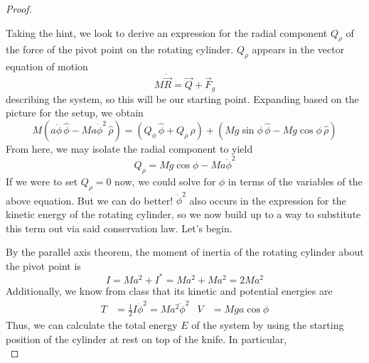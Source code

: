 \documentclass[../psets.tex]{subfiles}
\begin{document}
\begin{enumerate}
\begin{proof}
\begin{center}
        \end{center}
        Taking the hint, we look to derive an expression for the radial component $Q_\rho$ of the force of the pivot point on the rotating cylinder. $Q_\rho$ appears in the vector equation of motion
        \begin{equation*}
            M\ddot{\vec{R}} = \vec{Q}+\vec{F}_g
        \end{equation*}
        describing the system, so this will be our starting point. Expanding based on the picture for the setup, we obtain
        \begin{equation*}
            M(a\ddot{\phi}\,\hat{\phi}-Ma\dot{\phi}^2\,\hat{\rho}) = (Q_\phi\,\hat{\phi}+Q_\rho\,\hat{\rho})+(Mg\sin\phi\,\hat{\phi}-Mg\cos\phi\,\hat{\rho})
        \end{equation*}
        From here, we may isolate the radial component to yield
        \begin{equation*}
            Q_\rho = Mg\cos\phi-Ma\dot{\phi}^2
        \end{equation*}
        If we were to set $Q_\rho=0$ now, we could solve for $\phi$ in terms of the variables of the above equation. But we can do better! $\dot{\phi}^2$ also occurs in the expression for the kinetic energy of the rotating cylinder, so we now build up to a way to substitute this term out via said conservation law. Let's begin.\par
        By the parallel axis theorem, the moment of inertia of the rotating cylinder about the pivot point is
        \begin{equation*}
            I = Ma^2+I^*
            = Ma^2+Ma^2
            = 2Ma^2
        \end{equation*}
        Additionally, we know from class that its kinetic and potential energies are
        \begin{align*}
            T &= \frac{1}{2}I\dot{\phi}^2
                = Ma^2\dot{\phi}^2&
            V &= Mga\cos\phi
        \end{align*}
        Thus, we can calculate the total energy $E$ of the system by using the starting position of the cylinder at rest on top of the knife. In particular,
        \begin{equation*}

\end{equation*}
\end{proof}
\end{enumerate}
\end{document}

